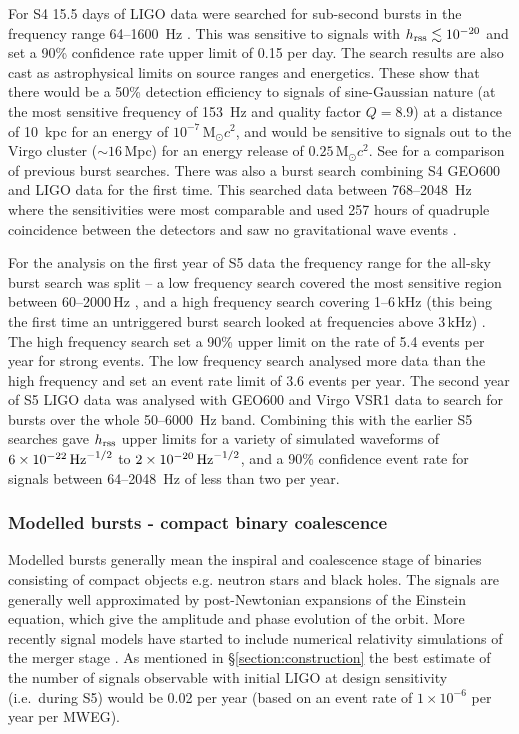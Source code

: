\documentclass{article}
\begin{document}
For S4 15.5 days of LIGO data were searched for sub-second bursts in the
frequency range 64--1600~Hz \cite{Abbott:2007b}. This was sensitive to signals
with $h_{\rm rss}\lesssim10^{-20}$ and set a 90\% confidence rate upper limit of
0.15 per day. The search results are also cast as astrophysical limits on source
ranges and energetics. These show that there would be a 50\% detection
efficiency to signals of sine-Gaussian nature (at the most sensitive frequency
of 153~Hz and quality factor $Q=8.9$) at a distance of 10~kpc for an energy of
$10^{-7}$\,M$_{\odot}c^2$, and would be sensitive to signals out to the Virgo
cluster ($\sim16$\,Mpc) for an energy release of $0.25$\,M$_{\odot}c^2$. See
\cite{Abbott:2007b} for a comparison of previous burst searches. There was also
a burst search combining S4 GEO600 and LIGO data for the first time. This
searched data between 768--2048~Hz where the sensitivities were most comparable
and used 257 hours of quadruple coincidence between the detectors and saw no
gravitational wave events \cite{Abbott:2008b}.

For the analysis on the first year of S5 data the frequency range for the
all-sky burst search was split -- a low frequency search covered the most
sensitive region between 60--2000\,Hz \cite{Abbott:2009h}, and a high frequency
search covering 1--6\,kHz (this being the first time an untriggered burst search
looked at frequencies above 3\,kHz) \cite{Abbott:2009i}. The high frequency
search set a 90\% upper limit on the rate of 5.4 events per year for strong
events. The low frequency search analysed more data than the high frequency and
set an event rate limit of 3.6 events per year. The second year of S5 LIGO data
was analysed with GEO600 and Virgo VSR1 data \cite{Abadie:2010d} to search for
bursts over the whole 50--6000~Hz band. Combining this with the earlier S5
searches gave $h_{\rm rss}$ upper limits for a variety of simulated waveforms of
$6\times10^{-22}\,{\rm Hz}^{-1/2}$ to $2\times10^{-20}\,{\rm Hz}^{-1/2}$, and a
90\% confidence event rate for signals between 64--2048~Hz of less than two per
year.

\subsubsection{Modelled bursts - compact binary coalescence}\label{sec:cbc}
Modelled bursts generally mean the inspiral and coalescence stage of binaries
consisting of compact objects e.g. neutron stars and black holes. The signals
are generally well approximated by post-Newtonian expansions of the Einstein
equation, which give the amplitude and phase evolution of the orbit. More
recently signal models have started to include numerical relativity simulations
of the merger stage \cite{Aylott:2009}. As mentioned in
\S\ref{section:construction} the best estimate of the number of signals
observable with initial LIGO at design sensitivity (i.e.~during S5) would be
0.02 per year (based on an event rate of $1\times10^{-6}$ per year per MWEG).
\end{document}
